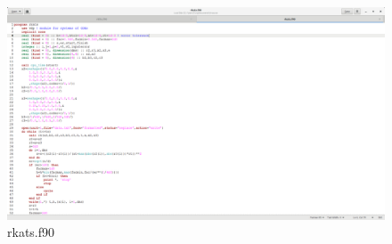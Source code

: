 \documentclass[a4paper,oneside]{book}
\numberwithin{equation}{chapter}
\begin{document}
	\begin{figure}[H]
		\centering	\includegraphics[width=15cm]{wfig02}
		\caption{rkats.f90}
	\end{figure}
\end{document}
